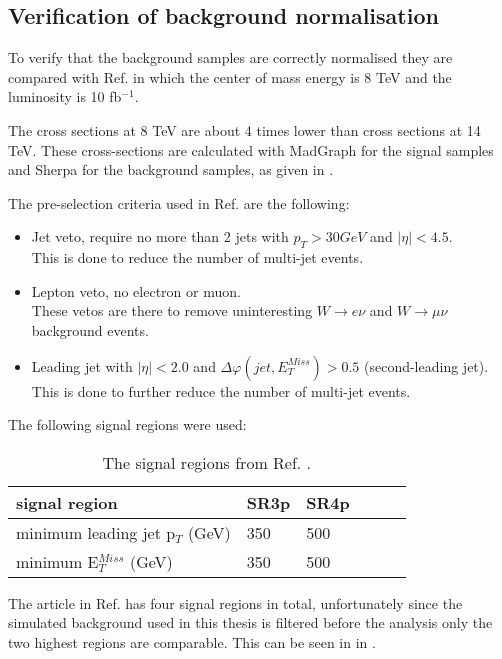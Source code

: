 \subsection{Verification of background normalisation}\label{sec:sig:subsec:veri} 	
To verify that the background samples are correctly normalised they are compared with Ref. \citep{ATLAS-CONF-2012-147} in which the center of mass energy is 8 TeV and the luminosity is 10 fb$^{-1}$. 

The cross sections at 8 TeV are about 4 times lower than cross sections at 14 TeV.
These cross-sections are calculated with MadGraph\citep{madgraph} for the signal samples and Sherpa \citep{sherpa} for the background samples, as given in . 

The pre-selection criteria used in Ref. \citep{ATLAS-CONF-2012-147} are the following:
\begin{itemize}
\item Jet veto, require no more than 2 jets with $p_T > 30 GeV$ and $|\eta| < 4.5$.  \\ 
This is done to reduce the number of multi-jet events.
\item Lepton veto, no electron or muon. \\
These vetos are there to remove uninteresting $W \rightarrow e \nu$ and $W \rightarrow \mu \nu$ background events.
\item Leading jet with $|\eta| < 2.0$ and $\Delta \varphi (jet, E_T^{Miss})>0.5$ (second-leading jet).\\ 
This is done to further reduce the number of multi-jet events.
\end{itemize}
The following signal regions were used:
\begin{table}[h]
\renewcommand{\arraystretch}{1.2} %
\begin{center}
\begin{tabular}{l l l l l l}
\hline
signal region & SR3p & SR4p \\ \hline
minimum leading jet p$_T$ (GeV) & 350 & 500 \\
minimum E$^{Miss}_T$ (GeV) & 350 & 500 \\ \hline
\end{tabular}
\label{tab:oldsr}
\caption{The signal regions from Ref. \citep{ATLAS-CONF-2012-147}.}
\end{center}
\renewcommand{\arraystretch}{1.0} %
\end{table}

The article in Ref. \citep{ATLAS-CONF-2012-147} has four signal regions in total, unfortunately since the simulated background used in this thesis is filtered before the analysis only the two highest regions are comparable. This can be seen in  in .

